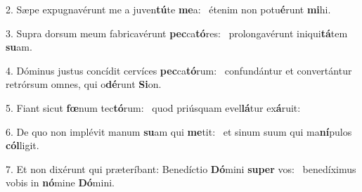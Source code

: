 2. Sæpe expugnavérunt me a juven\textbf{tú}te \textbf{me}a: \ast\  étenim non potu\textbf{é}runt \textbf{mi}hi.\

3. Supra dorsum meum fabricavérunt \textbf{pec}ca\textbf{tó}res: \ast\  prolongavérunt iniqui\textbf{tá}tem \textbf{su}am.\

4. Dóminus justus concídit cervíces \textbf{pec}ca\textbf{tó}rum: \ast\  confundántur et convertántur retrórsum omnes, qui o\textbf{dé}runt \textbf{Si}on.\

5. Fiant sicut \textbf{fœ}num tec\textbf{tó}rum: \ast\  quod priúsquam evel\textbf{lá}tur ex\textbf{á}ruit:\

6. De quo non implévit manum \textbf{su}am qui \textbf{me}tit: \ast\  et sinum suum qui ma\textbf{ní}pulos \textbf{cól}ligit.\

7. Et non dixérunt qui præteríbant: Benedíctio \textbf{Dó}mini \textbf{su}\textbf{per} vos: \ast\  benedíximus vobis in \textbf{nó}mine \textbf{Dó}mini.\

